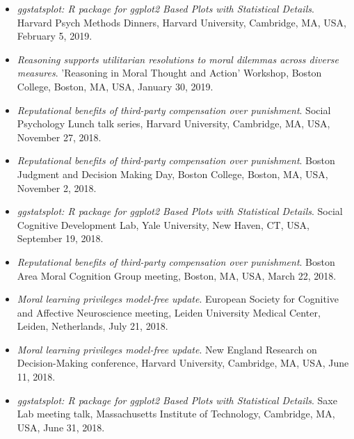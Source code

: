 \documentclass[10pt]{article}
\begin{document}
\begin{itemize}
	\item \textit{ggstatsplot: R package for ggplot2 Based Plots with Statistical Details}. Harvard Psych Methods Dinners, Harvard University, Cambridge, MA, USA, February 5, 2019.
	

	\item \textit{Reasoning supports utilitarian resolutions to moral dilemmas across diverse measures}. 'Reasoning in Moral Thought and Action' Workshop, Boston College, Boston, MA, USA, January 30, 2019.
		
	
	\item \textit{Reputational benefits of third-party compensation over punishment}. Social Psychology Lunch talk series, Harvard University, Cambridge, MA, USA, November 27, 2018.
		

%		

	\item \textit{Reputational benefits of third-party compensation over punishment}. Boston Judgment and Decision Making Day, Boston College, Boston, MA, USA, November 2, 2018.
		

	\item \textit{ggstatsplot: R package for ggplot2 Based Plots with Statistical Details}. Social Cognitive Development Lab, Yale University, New Haven, CT, USA, September 19, 2018.
	

	\item \textit{Reputational benefits of third-party compensation over punishment}. Boston Area Moral Cognition Group meeting, Boston, MA, USA, March 22, 2018.
	

	\item \textit{Moral learning privileges model-free update}. European Society for Cognitive and Affective Neuroscience meeting, Leiden University Medical Center, Leiden, Netherlands, July 21, 2018.
	
	
	\item \textit{Moral learning privileges model-free update}. New England Research on Decision-Making conference, Harvard University, Cambridge, MA, USA, June 11, 2018.
	

	\item \textit{ggstatsplot: R package for ggplot2 Based Plots with Statistical Details}. Saxe Lab meeting talk, Massachusetts Institute of Technology, Cambridge, MA, USA, June 31, 2018.
	

\end{itemize}
\end{document}

